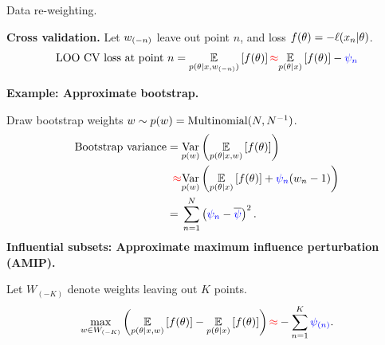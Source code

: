 



\begin{frame}[t]{Data re-weighting.}

    
    
    
    \pause
    \textbf{Cross validation.} 
    Let $w_{(-n)}$ leave out point $n$, and loss
    $f(\theta) = -\ell(x_n \vert \theta)$.
    \begin{align*}
    \textrm{LOO CV loss at point }n =
        \underset{p(\theta \vert x, w_{(-n)})}{\mathbb{E}}\left[f(\theta)\right]
    \textcolor{red}{\approx} 
        \underset{p(\theta \vert x)}{\mathbb{E}}\left[f(\theta)\right] - \textcolor{blue}{\psi_{n}}
    \end{align*}
    
    
    
    \pause
    \textbf{Example: Approximate bootstrap.}
    
    Draw bootstrap
    weights $w \sim p(w) = \textrm{Multinomial}(N, N^{-1})$.
    \begin{align*}
    \textrm{Bootstrap variance} ={}&
    \underset{p(w)}{\mathrm{Var}}\left(\underset{p(\theta \vert x, w)}{\mathbb{E}}\left[f(\theta)\right]\right) 
    \\\textcolor{red}{\approx}{}&
      \underset{p(w)}{\mathrm{Var}}\left(\underset{p(\theta \vert x)}{\mathbb{E}}\left[f(\theta)\right] + \textcolor{blue}{\psi_n}(w_n - 1)\right) 
    \\={}& \sum_{n=1}^N \left(\textcolor{blue}{\psi_n} - \overline{\textcolor{blue}{\psi}}\right)^2.
    \end{align*}
    \pause
    \textbf{Influential subsets:
    Approximate maximum influence perturbation (AMIP).}
    
    Let $W_{(-K)}$ denote weights leaving out $K$ points.
    \begin{align*}
    \max_{w \in W_{(-K)}} \left(
    \underset{p(\theta \vert x, w)}{\mathbb{E}}\left[f(\theta)\right] -
    \underset{p(\theta \vert x)}{\mathbb{E}}\left[f(\theta)\right]
    \right) \textcolor{red}{\approx} - \sum_{n=1}^K \textcolor{blue}{\psi_{(n)}}.
    \end{align*}
    
    
    
\end{frame}
    

